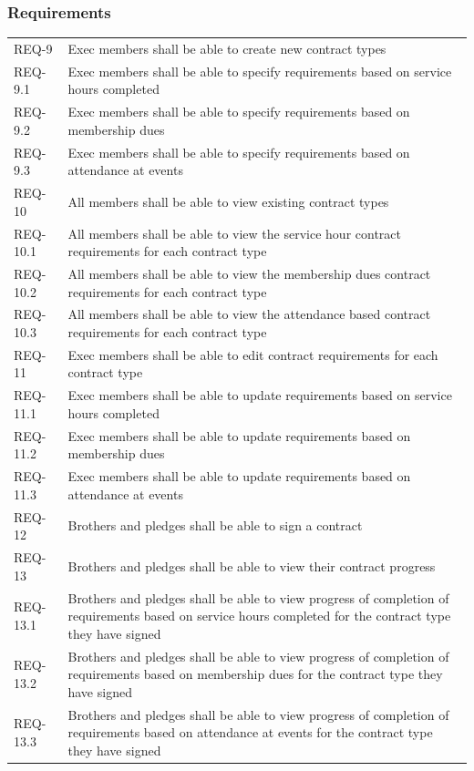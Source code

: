 \documentclass{article}
\newcommand{\req}[1]{REQ-{#1}}
\begin{document}
\subsubsection{Requirements}

\begin{tabular}{lp{8cm}}
\req{9} & Exec members shall be able to create new contract types \\
\req{9.1} & Exec members shall be able to specify requirements based
on service hours completed\\
\req{9.2} & Exec members shall be able to specify requirements based
on membership dues\\
\req{9.3} & Exec members shall be able to specify requirements based
on attendance at events\\
\req{10} & All members shall be able to view existing contract types\\
\req{10.1} & All members shall be able to view the service hour
contract requirements for each contract type\\
\req{10.2} & All members shall be able to view the membership dues
contract requirements for each contract type\\
\req{10.3} & All members shall be able to view the attendance based
contract requirements for each contract type\\
\req{11} & Exec members shall be able to edit contract requirements for
each contract type \\
\req{11.1} & Exec members shall be able to update requirements based
on service hours completed\\
\req{11.2} & Exec members shall be able to update requirements based
on membership dues\\
\req{11.3} & Exec members shall be able to update requirements based
on attendance at events\\
\req{12} & Brothers and pledges shall be able to sign a contract \\
\req{13} & Brothers and pledges shall be able to view their contract
progress\\
\req{13.1} & Brothers and pledges shall be able to view progress of completion
of requirements based
on service hours completed for the contract type they have signed\\
\req{13.2} & Brothers and pledges shall be able to view progress of completion
of requirements based
on membership dues for the contract type they have signed\\
\req{13.3} & Brothers and pledges shall be able to view progress of completion
of requirements based
on attendance at events for the contract type they have signed\\
\end{tabular}
\end{document}
